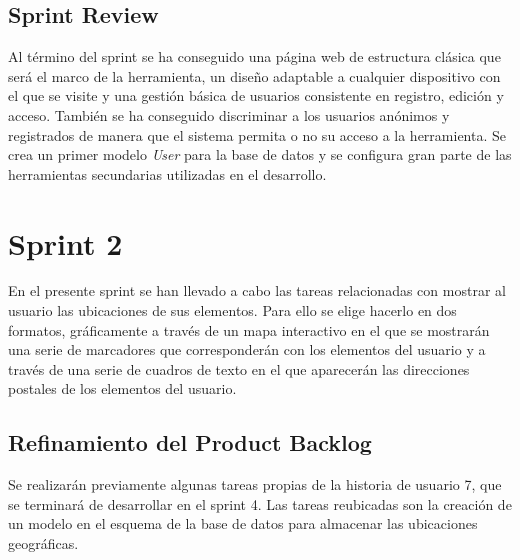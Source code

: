 	\subsection{Sprint Review}
	Al término del sprint se ha conseguido una página web de estructura clásica que será el marco de la herramienta, un diseño adaptable a cualquier dispositivo con el que se visite y una gestión básica de usuarios consistente en registro, edición y acceso. También se ha conseguido discriminar a los usuarios anónimos y registrados de manera que el sistema permita o no su acceso a la herramienta. Se crea un primer modelo \textit{User} para la base de datos y se configura gran parte de las herramientas secundarias utilizadas en el desarrollo.

\section{Sprint 2}
En el presente sprint se han llevado a cabo las tareas relacionadas con mostrar al usuario las ubicaciones de sus elementos. Para ello se elige hacerlo en dos formatos, gráficamente a través de un mapa interactivo en el que se mostrarán una serie de marcadores que corresponderán con los elementos del usuario y a través de una serie de cuadros de texto en el que aparecerán las direcciones postales de los elementos del usuario.
	\subsection{Refinamiento del Product Backlog}
	Se realizarán previamente algunas tareas propias de la historia de usuario 7, que se terminará de desarrollar en el sprint 4. Las tareas reubicadas son la creación de un modelo en el esquema de la base de datos para almacenar las ubicaciones geográficas.
	
